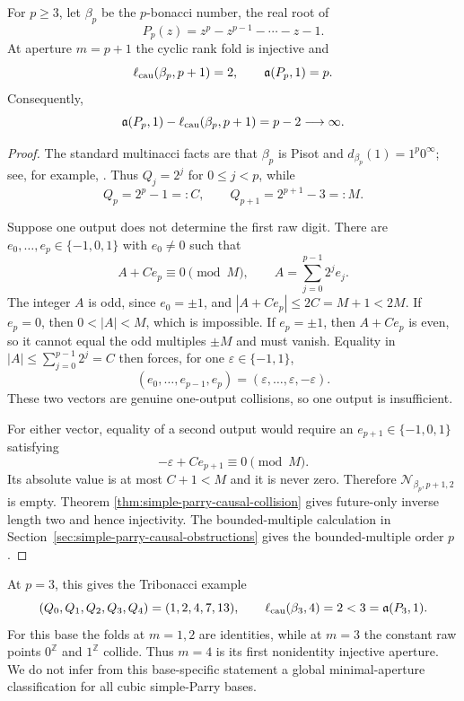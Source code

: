 \begin{corollary}
\label{cor:pbonacci-unbounded-separation}
For $p\ge3$, let $\beta_p$ be the $p$-bonacci number, the real root of
\[
P_p(z)=z^p-z^{p-1}-\cdots-z-1.
\]
At aperture $m=p+1$ the cyclic rank fold is injective and
\[
\ell_{\rm cau}(\beta_p,p+1)=2,
\qquad
\mathfrak a(P_p,1)=p.
\]
Consequently,
\[
\mathfrak a(P_p,1)-\ell_{\rm cau}(\beta_p,p+1)=p-2\longrightarrow\infty.
\]
\end{corollary}

\begin{proof}
The standard multinacci facts are that $\beta_p$ is Pisot and
$d_{\beta_p}(1)=1^p0^\infty$; see, for example, \cite{Kalle2014}.  Thus
$Q_j=2^j$ for $0\le j<p$, while
\[
Q_p=2^p-1=:C,
\qquad
Q_{p+1}=2^{p+1}-3=:M.
\]

Suppose one output does not determine the first raw digit.  There are
$e_0,\ldots,e_p\in\{-1,0,1\}$ with $e_0\ne0$ such that
\[
A+Ce_p\equiv0\pmod M,
\qquad
A=\sum_{j=0}^{p-1}2^je_j.
\]
The integer $A$ is odd, since $e_0=\pm1$, and
$|A+Ce_p|\le2C=M+1<2M$.  If $e_p=0$, then $0<|A|<M$, which is impossible.
If $e_p=\pm1$, then $A+Ce_p$ is even, so it cannot equal the odd multiples
$\pm M$ and must vanish.  Equality in
$|A|\le\sum_{j=0}^{p-1}2^j=C$ then forces, for one
$\varepsilon\in\{-1,1\}$,
\[
(e_0,\ldots,e_{p-1},e_p)
=(\varepsilon,\ldots,\varepsilon,-\varepsilon).
\]
These two vectors are genuine one-output collisions, so one output is
insufficient.

For either vector, equality of a second output would require an
$e_{p+1}\in\{-1,0,1\}$ satisfying
\[
-\varepsilon+Ce_{p+1}\equiv0\pmod M.
\]
Its absolute value is at most $C+1<M$ and it is never zero.  Therefore
$\mathcal N_{\beta_p,p+1,2}$ is empty.  Theorem
\ref{thm:simple-parry-causal-collision} gives future-only inverse length two and hence
injectivity.  The bounded-multiple calculation in
Section~\ref{sec:simple-parry-causal-obstructions} gives the
bounded-multiple order $p$.
\end{proof}

At $p=3$, this gives the Tribonacci example
\[
(Q_0,Q_1,Q_2,Q_3,Q_4)=(1,2,4,7,13),
\qquad
\ell_{\rm cau}(\beta_3,4)=2<3=\mathfrak a(P_3,1).
\]
For this base the folds at $m=1,2$ are identities, while at $m=3$ the
constant raw points $0^{\mathbb Z}$ and $1^{\mathbb Z}$ collide.  Thus
$m=4$ is its first nonidentity injective aperture.  We do not infer from this
base-specific statement a global minimal-aperture classification for all
cubic simple-Parry bases.

